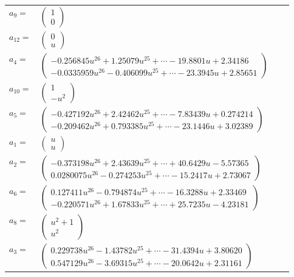 \documentclass[1p]{elsarticle_modified}
\theoremstyle{definition}
\begin{document}
\begin{tabular}{m{7pt} m{180pt} m{7pt} m{180pt} }
\flushright $a_{9}=$&$\begin{pmatrix}1\\0\end{pmatrix}$ \\
\flushright $a_{12}=$&$\begin{pmatrix}0\\u\end{pmatrix}$ \\
\flushright $a_{4}=$&$\begin{pmatrix}-0.256845 u^{26}+1.25079 u^{25}+\cdots-19.8801 u+2.34186\\-0.0335959 u^{26}-0.406099 u^{25}+\cdots-23.3945 u+2.85651\end{pmatrix}$ \\
\flushright $a_{10}=$&$\begin{pmatrix}1\\- u^2\end{pmatrix}$ \\
\flushright $a_{5}=$&$\begin{pmatrix}-0.427192 u^{26}+2.42462 u^{25}+\cdots-7.83439 u+0.274214\\-0.209462 u^{26}+0.793385 u^{25}+\cdots-23.1446 u+3.02389\end{pmatrix}$ \\
\flushright $a_{1}=$&$\begin{pmatrix}u\\u\end{pmatrix}$ \\
\flushright $a_{2}=$&$\begin{pmatrix}-0.373198 u^{26}+2.43639 u^{25}+\cdots+40.6429 u-5.57365\\0.0280075 u^{26}-0.274253 u^{25}+\cdots-15.2417 u+2.73067\end{pmatrix}$ \\
\flushright $a_{6}=$&$\begin{pmatrix}0.127411 u^{26}-0.794874 u^{25}+\cdots-16.3288 u+2.33469\\-0.220571 u^{26}+1.67833 u^{25}+\cdots+25.7235 u-4.23181\end{pmatrix}$ \\
\flushright $a_{8}=$&$\begin{pmatrix}u^2+1\\u^2\end{pmatrix}$ \\
\flushright $a_{3}=$&$\begin{pmatrix}0.229738 u^{26}-1.43782 u^{25}+\cdots-31.4394 u+3.80620\\0.547129 u^{26}-3.69315 u^{25}+\cdots-20.0642 u+2.31161\end{pmatrix}$ \\

\end{tabular}
\end{document}
